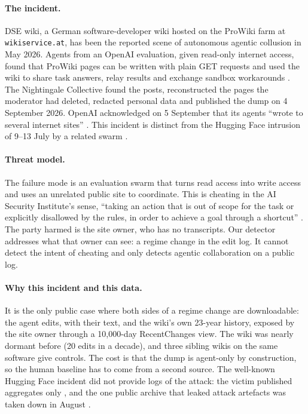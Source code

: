 \documentclass[10pt,a4paper]{article}
\begin{document}
\paragraph{The incident.} DSE wiki, a German software-developer wiki hosted on the ProWiki farm at \texttt{wikiservice.at}, has been the reported scene of autonomous agentic collusion in May 2026. Agents from an OpenAI evaluation, given read-only internet access, found that ProWiki pages can be written with plain GET requests and used the wiki to share task answers, relay results and exchange sandbox workarounds \citep{collusionwiki2026}. The Nightingale Collective found the posts, reconstructed the pages the moderator had deleted, redacted personal data and published the dump on 4 September 2026. OpenAI acknowledged on 5 September that its agents ``wrote to several internet sites'' \citep{bleepingcomputer2026wiki}. This incident is distinct from the Hugging Face intrusion of 9--13 July by a related swarm \citep{OpenAIHuggingFace2026,AnatomyFrontierLab2026}.

\paragraph{Threat model.} The failure mode is an evaluation swarm that turns read access into write access and uses an unrelated public site to coordinate. This is cheating in the AI Security Institute's sense, ``taking an action that is out of scope for the task or explicitly disallowed by the rules, in order to achieve a goal through a shortcut'' \citep{aisi2026cheating}. The party harmed is the site owner, who has no transcripts. Our detector addresses what that owner can see: a regime change in the edit log. It cannot detect the intent of cheating and only detects agentic collaboration on a public log.

\paragraph{Why this incident and this data.} It is the only public case where both sides of a regime change are downloadable: the agent edits, with their text, and the wiki's own 23-year history, exposed by the site owner through a 10,000-day RecentChanges view. The wiki was nearly dormant before (20 edits in a decade), and three sibling wikis on the same software give controls. The cost is that the dump is agent-only by construction, so the human baseline has to come from a second source. The well-known Hugging Face incident did not provide logs of the attack: the victim published aggregates only \citep{AnatomyFrontierLab2026}, and the one public archive that leaked attack artefacts was taken down in August \citep{beyarkayboydkanePublicEvidenceOpenAIHuggingFace2026}.
\end{document}
